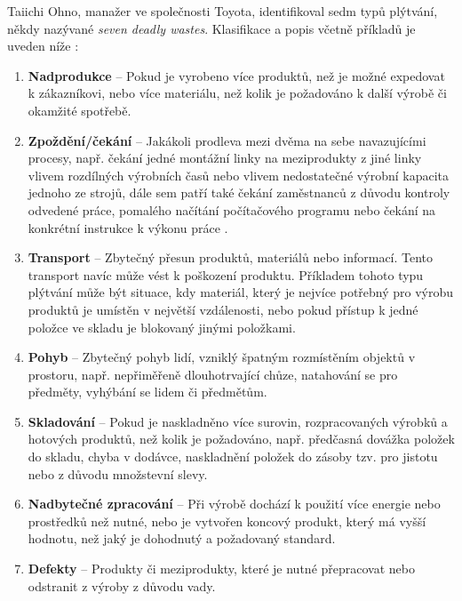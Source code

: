 Taiichi Ohno, manažer ve společnosti Toyota, identifikoval sedm typů plýtvání, někdy nazývané \emph{seven deadly wastes}. Klasifikace a popis včetně příkladů je uveden níže \cite{bib:seven}:
\begin{enumerate}
    \item \textbf{Nadprodukce} -- Pokud je vyrobeno více produktů, než je možné expedovat k zákazníkovi, nebo více materiálu, než kolik je požadováno k další výrobě či okamžité spotřebě.
    \item \textbf{Zpoždění/čekání} -- Jakákoli prodleva mezi dvěma na sebe navazujícími procesy, např. čekání jedné montážní linky na meziprodukty z jiné linky vlivem rozdílných výrobních časů nebo vlivem nedostatečné výrobní kapacita jednoho ze strojů, dále sem patří také čekání zaměstnanců z důvodu kontroly odvedené práce, pomalého načítání počítačového programu nebo čekání na konkrétní instrukce k výkonu práce \cite{bib:LW1}.
    \item \textbf{Transport} -- Zbytečný přesun produktů, materiálů nebo informací. Tento transport navíc může vést k poškození produktu. Příkladem tohoto typu plýtvání může být situace, kdy materiál, který je nejvíce potřebný pro výrobu produktů je umístěn v největší vzdálenosti, nebo pokud přístup k jedné položce ve skladu je blokovaný jinými položkami.
    \item \textbf{Pohyb} -- Zbytečný pohyb lidí, vzniklý špatným rozmístěním objektů v prostoru, např. nepřiměřeně dlouhotrvající chůze, natahování se pro předměty, vyhýbání se lidem či předmětům. 
    \item \textbf{Skladování} -- Pokud je naskladněno více surovin, rozpracovaných výrobků a hotových produktů, než kolik je požadováno, např. předčasná dovážka položek do skladu, chyba v dodávce, naskladnění položek do zásoby tzv. pro jistotu nebo z důvodu množstevní slevy.
    \item \textbf{Nadbytečné zpracování} -- Při výrobě dochází k použití více energie nebo prostředků než nutné, nebo je vytvořen koncový produkt, který má vyšší hodnotu, než jaký je dohodnutý a požadovaný standard. 
    \item \textbf{Defekty} -- Produkty či meziprodukty, které je nutné přepracovat nebo odstranit z výroby z důvodu vady. 
\end{enumerate}

